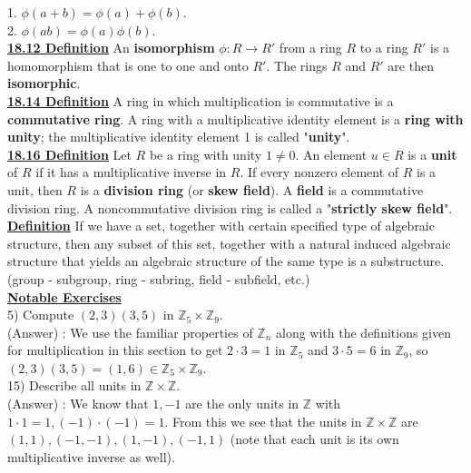 \documentclass[12pt, letterpaper]{article}
\begin{document}
1. $\phi(a+b)= \phi(a) + \phi(b)$. \\

2. $\phi(ab) = \phi(a) \phi(b)$. \\

\noindent \underline{\bf 18.12 Definition} An {\bf isomorphism} $\phi : R \rightarrow R'$ from a ring $R$ to a ring $R'$ is a homomorphism that is one to one and onto $R'$. The rings $R$ and $R'$ are then {\bf isomorphic}. \\

\noindent \underline{\bf 18.14 Definition} A ring in which multiplication is commutative is a {\bf commutative ring}. A ring with a multiplicative identity element is a {\bf ring with unity}; the multiplicative identity element 1 is called "{\bf unity}". \\

\noindent \underline{\bf 18.16 Definition} Let $R$ be a ring with unity $1 \neq 0$. An element $u \in R$ is a {\bf unit} of $R$ if it has a multiplicative inverse in $R$. If every nonzero element of $R$ is a unit, then $R$ is a {\bf division ring} (or {\bf skew field}). A {\bf field} is a commutative division ring. A noncommutative division ring is called a "{\bf strictly skew field}". \\

\noindent \underline{\bf Definition} If we have a set, together with certain specified type of algebraic structure, then any subset of this set, together with a natural induced algebraic structure that yields an algebraic structure of the same type is a substructure. (group - subgroup, ring - subring, field - subfield, etc.) \\

\noindent \underline{\bf Notable Exercises} \\

5) Compute $(2,3)(3,5)$ in $\mathbb{Z}_5 \times \mathbb{Z}_9$. \\

(Answer) : We use the familiar properties of $\mathbb{Z}_n$ along with the definitions given for multiplication in this section to get $2 \cdot 3 = 1$ in $\mathbb{Z}_5$ and $3 \cdot 5 = 6$ in $\mathbb{Z}_9$, so $(2,3)(3,5) = (1,6) \in  \mathbb{Z}_5 \times \mathbb{Z}_9$. \\

15) Describe all units in $\mathbb{Z} \times \mathbb{Z}$. \\

(Answer) : We know that $1,-1$ are the only units in $\mathbb{Z}$ with $1 \cdot 1 = 1, (-1) \cdot (-1) = 1$. From this we see that the units in $\mathbb{Z}\times \mathbb{Z}$ are $(1,1),(-1,-1),(1,-1),(-1,1)$ (note that each unit is its own multiplicative inverse as well). \\
\end{document}
